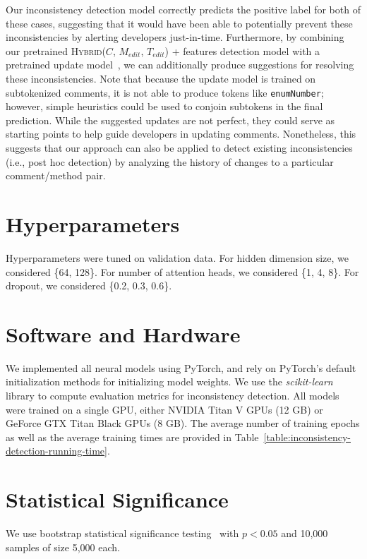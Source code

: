 \documentclass[letterpaper]{article} %
\newcommand{\Comment}{$C$}
\newcommand{\Posthoc}{post hoc}
\newcommand{\JustInTime}{just-in-time}
\newcommand{\EditCode}{$M_{edit}$}
\newcommand{\EditTree}{$T_{edit}$}
\newcommand{\HybridModel}{\textsc{Hybrid}}
\newcommand{\JustInTimeHybrid}{\HybridModel{}(\Comment{}, \EditCode{}, \EditTree{})}
\begin{document}
 Our inconsistency detection model correctly predicts the positive label for both of these cases, suggesting that it
 would have been able to potentially prevent these inconsistencies by alerting developers \JustInTime{}. Furthermore, by combining our pretrained \JustInTimeHybrid{} + features detection model with a pretrained update model~\cite{panthaplackel2020update}, we can additionally produce suggestions for resolving these inconsistencies. Note that because the update model is trained on subtokenized comments, it is not able to produce tokens like \texttt{enumNumber}; however, simple heuristics could be used to conjoin subtokens in the final prediction. While the suggested updates are not perfect, they could serve as starting points to help guide developers in updating comments. Nonetheless, this suggests that our approach can also be applied to detect existing inconsistencies (i.e., \Posthoc{} detection) by analyzing the history of changes to a particular comment/method pair.
 
  
 
 \section{Hyperparameters}
Hyperparameters were tuned on validation data. For hidden dimension size, we considered \{64, 128\}. For number of attention heads, we considered \{1, 4, 8\}. For dropout, we considered \{0.2, 0.3, 0.6\}.

\section{Software and Hardware}
We implemented all neural models using PyTorch, and rely on PyTorch's default initialization methods for initializing model weights. We use the \textit{scikit-learn} library to compute evaluation metrics for inconsistency detection. All models were trained on a single GPU, either NVIDIA Titan V GPUs (12 GB) or GeForce GTX Titan Black GPUs (8 GB). The average number of training epochs as well as the average training times are provided in Table~\ref{table:inconsistency-detection-running-time}. 

\section{Statistical Significance}
We use bootstrap statistical significance testing~\cite{berg-kirkpatrick-etal-2012-empirical} with $p<0.05$ and 10,000 samples of size 5,000 each.
\end{document}
